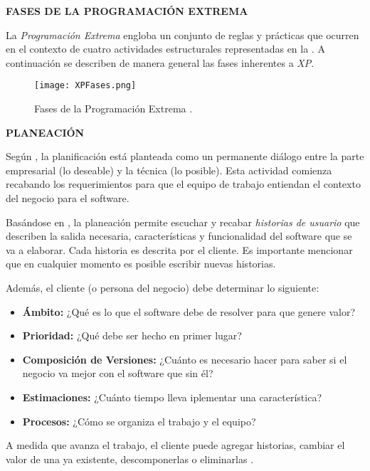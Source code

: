 \textbf{FASES DE LA PROGRAMACIÓN EXTREMA}

La \textit{Programación Extrema} engloba un conjunto de reglas y prácticas que ocurren en el contexto de cuatro actividades estructurales representadas en la . A continuación se describen de manera general las fases inherentes a \textit{XP}.

\begin{figure}[h!]
    \centering
    \texttt{[image: XPFases.png]}
    \caption{Fases de la Programación Extrema \parencite{pressman2010ingenieria}.}
    \label{fig:XPFases}
\end{figure}

\textbf{PLANEACIÓN}

Según \parencite{solis2003XP}, la planificación está planteada como un permanente diálogo entre la parte empresarial (lo deseable) y la técnica (lo posible).
Esta actividad comienza recabando los requerimientos para que el equipo de trabajo entiendan el contexto del negocio para el software. 

Basándose en \parencite{pressman2010ingenieria}, la planeación permite escuchar y recabar \textit{historias de usuario} que describen la salida necesaria, características y funcionalidad del software que se va a elaborar. Cada historia es descrita por el cliente. Es importante mencionar que en cualquier momento es posible escribir nuevas historias.

Además, el cliente (o persona del negocio) debe determinar lo siguiente:

\begin{itemize}
    \item \textbf{Ámbito:} ¿Qué es lo que el software debe de resolver para que genere valor?
    \item \textbf{Prioridad: } ¿Qué debe ser hecho en primer lugar?
    \item \textbf{Composición de Versiones: } ¿Cuánto es necesario hacer para saber si el negocio va mejor con el software que sin él?
    \item \textbf{Estimaciones: } ¿Cuánto tiempo lleva iplementar una característica?
    \item \textbf{Procesos: } ¿Cómo se organiza el trabajo y el equipo?
\end{itemize}

A medida que avanza el trabajo, el cliente puede agregar historias, cambiar el valor de una ya existente, descomponerlas o eliminarlas \parencite{pressman2010ingenieria}.


